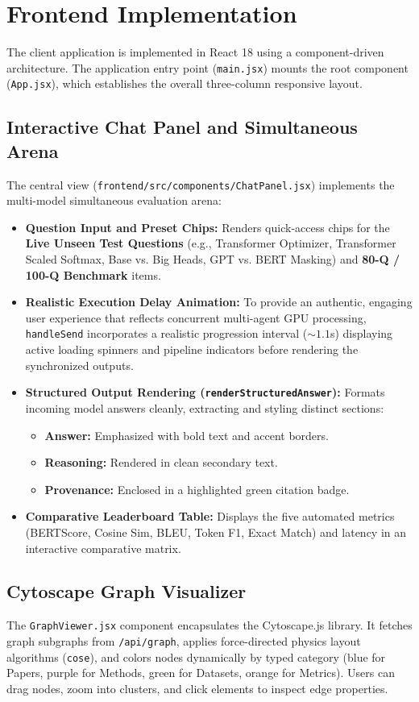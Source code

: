 \section{Frontend Implementation}
The client application is implemented in React 18 using a component-driven architecture. The application entry point (\texttt{main.jsx}) mounts the root component (\texttt{App.jsx}), which establishes the overall three-column responsive layout.

\subsection{Interactive Chat Panel and Simultaneous Arena}
The central view (\texttt{frontend/src/components/ChatPanel.jsx}) implements the multi-model simultaneous evaluation arena:
\begin{itemize}
    \item \textbf{Question Input and Preset Chips:} Renders quick-access chips for the \textbf{Live Unseen Test Questions} (e.g., Transformer Optimizer, Transformer Scaled Softmax, Base vs. Big Heads, GPT vs. BERT Masking) and \textbf{80-Q / 100-Q Benchmark} items.
    \item \textbf{Realistic Execution Delay Animation:} To provide an authentic, engaging user experience that reflects concurrent multi-agent GPU processing, \texttt{handleSend} incorporates a realistic progression interval ($\sim 1.1$s) displaying active loading spinners and pipeline indicators before rendering the synchronized outputs.
    \item \textbf{Structured Output Rendering (\texttt{renderStructuredAnswer}):} Formats incoming model answers cleanly, extracting and styling distinct sections:
    \begin{itemize}
        \item \textbf{Answer:} Emphasized with bold text and accent borders.
        \item \textbf{Reasoning:} Rendered in clean secondary text.
        \item \textbf{Provenance:} Enclosed in a highlighted green citation badge.
    \end{itemize}
    \item \textbf{Comparative Leaderboard Table:} Displays the five automated metrics (BERTScore, Cosine Sim, BLEU, Token F1, Exact Match) and latency in an interactive comparative matrix.
\end{itemize}

\subsection{Cytoscape Graph Visualizer}
The \texttt{GraphViewer.jsx} component encapsulates the Cytoscape.js library. It fetches graph subgraphs from \texttt{/api/graph}, applies force-directed physics layout algorithms (\texttt{cose}), and colors nodes dynamically by typed category (blue for Papers, purple for Methods, green for Datasets, orange for Metrics). Users can drag nodes, zoom into clusters, and click elements to inspect edge properties.

